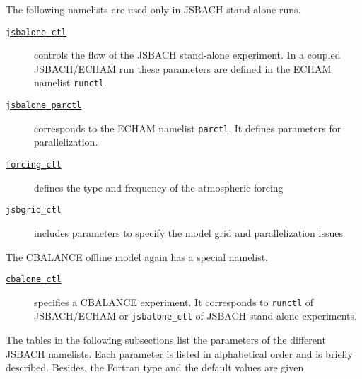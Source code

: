 The following namelists are used only in JSBACH stand-alone runs.
\begin{description}
  \item[\hyperlink{apdx:jsbalone_ctl}{\tt jsbalone\_ctl}] controls the flow of the JSBACH stand-alone experiment. In a coupled JSBACH/ECHAM run these parameters are defined in the ECHAM namelist {\tt runctl}.
  \item[\hyperlink{apdx:jsbalone_parctl}{\tt jsbalone\_parctl}] corresponds to the ECHAM namelist {\tt parctl}. It defines parameters for parallelization.
  \item[\hyperlink{apdx:forcing_ctl}{\tt forcing\_ctl}] defines the type and frequency of the atmospheric forcing 
  \item[\hyperlink{apdx:jsbgrid_ctl}{\tt jsbgrid\_ctl}] includes parameters to specify the model grid and parallelization issues
\end{description}

The CBALANCE offline model again has a special namelist. 
\begin{description}
  \item[\hyperlink{apdx:cbalone_ctl}{\tt cbalone\_ctl}] specifies a CBALANCE experiment. It corresponds to {\tt runctl} of JSBACH/ECHAM or {\tt jsbalone\_ctl} of JSBACH stand-alone experiments.
\end{description}

The tables in the following subsections list the parameters of the different JSBACH namelists. Each parameter is listed in alphabetical order and is briefly described. Besides, the Fortran type and the default values are given.

